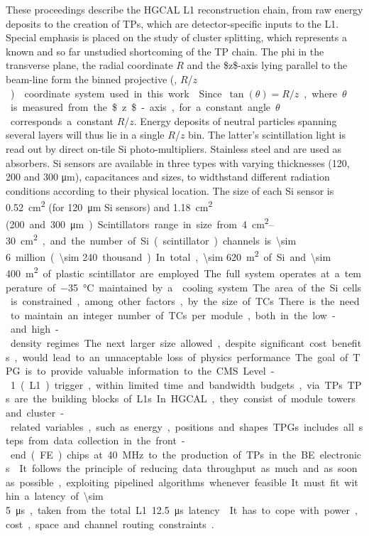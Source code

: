 \documentclass[11pt]{article}
\newcommand{\coordsa}{(\si{\azi}, \si{\rz})}
\newcommand{\rz}{$R$/$z$}
\begin{document}
These proceedings describe the \ac{HGCAL} \ac{L1} reconstruction chain, from raw energy deposits to the creation of \acp{TP}, which are detector-specific inputs to the \ac{L1}.
Special emphasis is placed on the study of cluster splitting, which represents a known and so far unstudied shortcoming of the \ac{TP} chain.
The \ac{phi} in the transverse plane, the radial coordinate \(R\) and the \$z\$-axis lying parallel to the beam-line form the binned projective \coordsa{} coordinate system used in this work \cite{cms_collab}.
Since \(\tan(\theta) = R/z\), where \(\theta\) is measured from the \$z\$-axis, for a constant angle \(\theta\) corresponds a constant \rz{}.
Energy deposits of neutral particles spanning several layers will thus lie in a single \rz{} bin.
The latter's scintillation light is read out by direct on-tile \ac{Si} photo-multipliers. Stainless steel and  are used as absorbers.
\ac{Si} sensors are available in three types with varying thicknesses (120, 200 and 300 \si{\micro\meter}), capacitances and sizes, to widthstand different radiation conditions according to their physical location.
The size of each \ac{Si} sensor is \SI{0.52}{\cm\squared} (for \SI{120}{\micro\meter} \ac{Si} sensors) and \SI{1.18}{\cm\squared} (\qty{200} and \SI{300}{\micro\meter}).
Scintillators range in size from \qtyrange{4}{30}{\cm\squared}, and the number of \ac{Si} (scintillator) channels is \num{\sim 6} million (\num{\sim 240} thousand).
In total, \SI{\sim 620}{\meter\squared} of \ac{Si} and \SI{\sim 400}{\meter\squared} of plastic scintillator are employed.
The full system operates at a temperature of \SI{-35}{\celsius} maintained by a  cooling system.

The area of the \ac{Si} cells is constrained, among other factors, by the size of \acp{TC}.
There is the need to maintain an integer number of \acp{TC} per module, both in the low- and high-density regimes.
The next larger size allowed, despite significant cost benefits, would lead to an unnaceptable loss of physics performance.

The goal of \ac{TPG} is to provide valuable information to the CMS Level-1 (L1) trigger, within limited time and bandwidth budgets, via \acp{TP}.
\acp{TP} are the building blocks of \acp{L1}.
In HGCAL, they consist of module towers and cluster-related variables, such as energy, positions and shapes.
\acp{TPG} includes all steps from data collection in the front-end (FE) chips at \SI{40}{\mega\hertz} to the production of \acp{TP} in the \ac{BE} electronics \cite{hgcalTDR}.
It follows the principle of reducing data throughput as much and as soon as possible, exploiting pipelined algorithms whenever feasible.
It must fit within a latency of \SI{\sim 5}{\micro\second}, taken from the total L1 \SI{12.5}{\micro\second} latency \cite{l1TDR}.
It has to cope with power, cost, space and channel routing constraints \cite{jb_hdr}.
\end{document}
